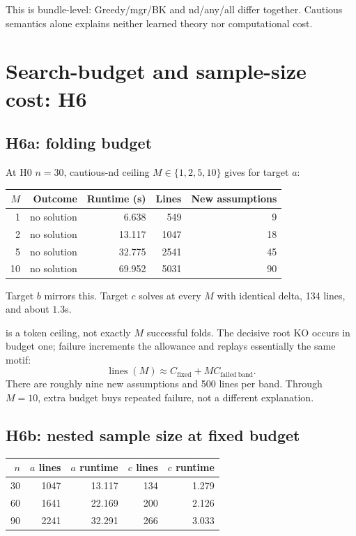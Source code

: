 \documentclass[11pt]{article}
\DeclareRobustCommand{\code}[1]{\texttt{\detokenize{#1}}}
\begin{document}
This is bundle-level: Greedy/mgr/BK and nd/any/all differ together. Cautious
semantics alone explains neither learned theory nor computational cost.

\section{Search-budget and sample-size cost: H6}

\subsection{H6a: folding budget}

At H0 \(n=30\), cautious-nd ceiling \(M\in\{1,2,5,10\}\) gives for target \(a\):

\begin{center}
\begin{tabular}{@{}rrrrr@{}}
\toprule
\(M\) & Outcome & Runtime (s) & Lines & New assumptions \\
\midrule
1 & no solution & 6.638 & 549 & 9 \\
2 & no solution & 13.117 & 1047 & 18 \\
5 & no solution & 32.775 & 2541 & 45 \\
10 & no solution & 69.952 & 5031 & 90 \\
\bottomrule
\end{tabular}
\end{center}

Target \(b\) mirrors this. Target \(c\) solves at every \(M\) with identical
delta, 134 lines, and about \(1.3\)s.

\code{folding_steps(M)} is a token ceiling, not exactly \(M\) successful folds.
The decisive root KO occurs in budget one; failure increments the allowance
and replays essentially the same motif:
\[
\operatorname{lines}(M)\approx C_{\mathrm{fixed}}+
M C_{\mathrm{failed\ band}}.
\]
There are roughly nine new assumptions and 500 lines per band. Through
\(M=10\), extra budget buys repeated failure, not a different explanation.

\subsection{H6b: nested sample size at fixed budget}

\begin{center}
\begin{tabular}{@{}rrrrr@{}}
\toprule
\(n\) & \(a\) lines & \(a\) runtime & \(c\) lines & \(c\) runtime \\
\midrule
30 & 1047 & 13.117 & 134 & 1.279 \\
60 & 1641 & 22.169 & 200 & 2.126 \\
90 & 2241 & 32.291 & 266 & 3.033 \\
\bottomrule
\end{tabular}
\end{center}
\end{document}
